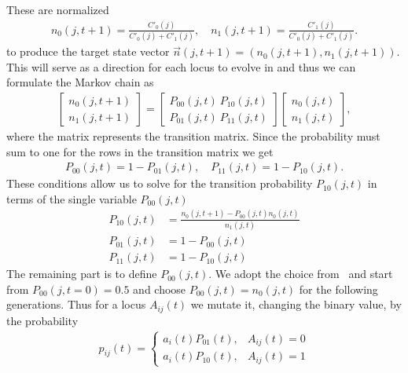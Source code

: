 These are normalized
\begin{align}
  n_0(j, t+1) = \frac{C'_0(j)}{C'_0(j) + C'_1(j)}, \quad n_1(j, t+1) = \frac{C'_1(j)}{C'_0(j) + C'_1(j)}.
  \label{eq:target_states}
\end{align}
to produce the target state vector $\vec{n}(j,t+1)=(n_0(j, t+1), n_1(j, t+1))$.  This will serve as a direction for each locus to evolve in and thus we can formulate the Markov chain as
\begin{align*}
  \begin{bmatrix}
    n_0(j, t+1) \\
    n_1(j, t+1)
  \end{bmatrix}
  = 
  \begin{bmatrix}
    P_{00}(j,t) \ P_{10}(j,t) \\
    P_{01}(j,t) \ P_{11}(j,t)
  \end{bmatrix}
  \begin{bmatrix}
    n_0(j, t) \\
    n_1(j, t)
  \end{bmatrix},
\end{align*}
where the matrix represents the transition matrix. Since the probability must sum to one for the rows in the transition matrix we get 
\begin{align*}
  P_{00}(j, t) = 1 - P_{01}(j, t), \quad P_{11}(j, t) = 1 - P_{10}(j, t).
\end{align*}
These conditions allow us to solve for the transition probability $P_{10}(j,t)$ in terms of the single variable $P_{00}(j,t)$
\begin{align}
  P_{10}(j,t) &= \frac{n_0(j, t+1) - P_{00}(j,t)n_0(j, t)}{n_1(j,t)}  \label{eq:trans_prop_p10}\\
  P_{01}(j,t) &= 1 - P_{00}(j,t) \label{eq:trans_prop_p01} \\
  P_{11}(j,t) &= 1 - P_{10}(j,t) \label{eq:trans_prop_p11}
\end{align}
The remaining part is to define $P_{00}(j,t)$. We adopt the choice from~\cite{Wang2010} and start from $P_{00}(j, t = 0) = 0.5$ and choose $P_{00}(j,t) = n_0(j,t)$ for the following generations. Thus for a locus $A_{ij}(t)$ we mutate it, changing the binary value, by the probability
\begin{align*}
  p_{ij}(t) = 
  \begin{cases}
    a_i(t)P_{01}(t), &A_{ij}(t) = 0 \\
    a_i(t)P_{10}(t), &A_{ij}(t) = 1
  \end{cases}
  \label{eq:p_flip}
\end{align*}
